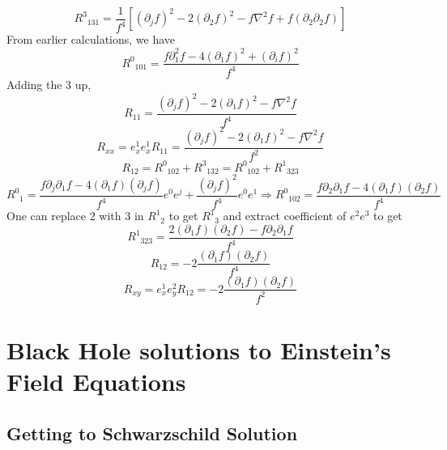 ﻿\documentclass[12pt,a4paper]{article}
\begin{document}
$$
R_{\;\;131}^{3}=\frac{1}{f^{4}}\left[\left(\partial_{j} f\right)^{2}-2\left(\partial_{2} f\right)^{2}-f \nabla^{2} f+f\left(\partial_{2} \partial_{2} f\right)\right]
$$
From earlier calculations, we have
$$
R_{\;\;101}^{0}=\frac{f \partial_{1}^{2} f-4\left(\partial_{1} f\right)^{2}+\left(\partial_{i} f\right)^{2}}{f^{4}}
$$
Adding the 3 up,
$$
R_{11}=\frac{\left(\partial_{j} f\right)^{2}-2\left(\partial_{1} f\right)^{2}-f \nabla^{2} f}{f^{4}}
$$
$$
R_{xx}=e^{1}_{x}e^{1}_{x}R_{11}=\frac{\left(\partial_{j} f\right)^{2}-2\left(\partial_{1} f\right)^{2}-f \nabla^{2} f}{f^{2}}
$$
$$
R_{12}=R_{\;\;102}^{0}+R_{\;\;132}^{3}=R_{\;\;102}^{0}+R_{\;\;323}^{1}
$$
$$
R_{\;\;1}^{0}=\frac{f \partial_{j} \partial_{1} f-4\left(\partial_{1} f\right)\left(\partial_{j} f\right)}{f^{4}} e^{0} e^{j}+\frac{\left(\partial_{j} f\right)^{2}}{f^{4}} e^{0} e^{1}\Rightarrow R_{\;\;102}^{0}=\frac{f \partial_{2} \partial_{1} f-4\left(\partial_{1} f\right)\left(\partial_{2} f\right)}{f^{4}}
$$
One can replace $2$ with $3$ in $R_{\;\;2}^{1}$ to get $R_{\;\;3}^{1}$ and extract coefficient of $e^{2}e^{3}$ to get 
$$
R_{\;\;323}^{1}=\frac{2\left(\partial_{1} f\right)\left(\partial_{2} f\right)-f \partial_{2} \partial_{1} f}{f^{4}}
$$
$$
R_{12}=-2\frac{\left(\partial_{1} f\right)\left(\partial_{2} f\right)}{f^{4}}
$$
$$
R_{xy}=e^{1}_{x}e^{2}_{y}R_{12}=-2\frac{\left(\partial_{1} f\right)\left(\partial_{2} f\right)}{f^{2}}
$$


\section{Black Hole solutions to Einstein's Field Equations}

\subsection{Getting to Schwarzschild Solution}
\end{document}
